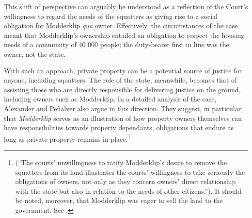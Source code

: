 This shift of perspective can arguably be understood as a reflection of the Court's willingness to regard the needs of the squatters as giving rise to a social obligation for Modderklip {\it qua} owner. Effectively, the circumstances of the case meant that Modderklip's ownership entailed an obligation to respect the housing needs of a community of 40 000 people; the duty-bearer first in line was the owner, not the state.

With such an approach, private property can be a potential source of justice for anyone, including squatters. The role of the state, meanwhile, becomes that of assisting those who are directly responsible for delivering justice on the ground, including owners such as Modderklip. In a detailed analysis of the case, Alexander and Pe\~{n}alver also argue in this direction. They suggest, in particular, that {\it Modderklip} serves as an illustration of how property owners themselves can have responsibilities towards property dependants, obligations that endure as long as private property remains in place.\footnote{\cite[157]{alexander09d} (``The courts' unwillingness to ratify Modderklip's desire to remove the squatters from its land illustrates the courts' willingness to take seriously the obligations of owners, not only as they concern owners' direct relationship with the state but also in relation to the needs of other citizens.''). It should be noted, moreover, that Modderklip was eager to sell the land to the government. See \cite[61]{modderklip05}.} 

